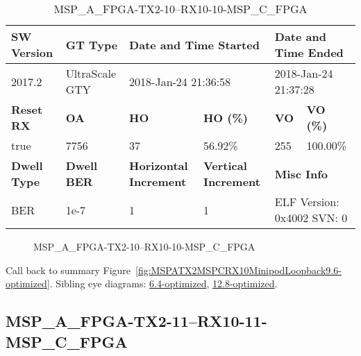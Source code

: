 \begin{table}[h]
\centering
\caption{MSP\_A\_FPGA-TX2-10--RX10-10-MSP\_C\_FPGA}
\label{tab:MSPAFPGATX210RX1010MSPCFPGA9.6-optimized}
\begin{tabular}{@{}|l|l|l|l|l|l|@{}}
\toprule
\textbf{SW Version}                & \textbf{GT Type}   & \multicolumn{2}{l|}{\textbf{Date and Time Started}}            & \multicolumn{2}{l|}{\textbf{Date and Time Ended}}        \\ \midrule
2017.2                       & UltraScale GTY          & \multicolumn{2}{l|}{2018-Jan-24 21:36:58}                   & \multicolumn{2}{l|}{2018-Jan-24 21:37:28}               \\ \midrule
\textbf{Reset RX}                  & \textbf{OA} & \textbf{HO}   & \textbf{HO (\%)} & \textbf{VO} & \textbf{VO (\%)} \\ \midrule
true & 7756        & 37          & 56.92\%        & 255        & 100.00\%       \\ \midrule
\textbf{Dwell Type}                & \textbf{Dwell BER} & \textbf{Horizontal Increment} & \textbf{Vertical Increment}    & \multicolumn{2}{l|}{\textbf{Misc Info}}                  \\ \midrule
BER                            & 1e-7        & 1        & 1           & \multicolumn{2}{l|}{ELF Version: 0x4002 SVN: 0}                         \\ \bottomrule
\end{tabular}
\end{table}

\begin{figure}[h]
\caption{MSP\_A\_FPGA-TX2-10--RX10-10-MSP\_C\_FPGA} \label{fig:MSPAFPGATX210RX1010MSPCFPGA9.6-optimized}
\end{figure}

Call back to summary Figure~\ref{fig:MSPATX2MSPCRX10MinipodLoopback9.6-optimized}.
Sibling eye diagrams: \hyperref[sec:MSPAFPGATX210RX1010MSPCFPGA6.4-optimized]{6.4-optimized}, \hyperref[sec:MSPAFPGATX210RX1010MSPCFPGA12.8-optimized]{12.8-optimized}.

\clearpage
\newpage


\subsection{MSP\_A\_FPGA-TX2-11--RX10-11-MSP\_C\_FPGA}\label{sec:MSPAFPGATX211RX1011MSPCFPGA9.6-optimized}

